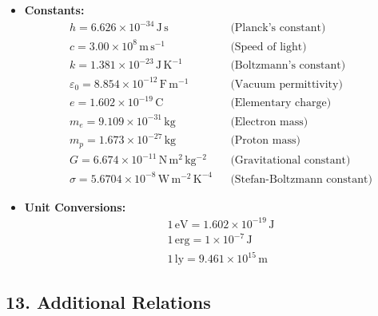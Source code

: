 \documentclass{article}
\begin{document}
\begin{itemize}
    \item \textbf{Constants:}
          \begin{align*}
               & h = 6.626 \times 10^{-34} \, \mathrm{J\,s}                   &  & \text{(Planck's constant)}         \\
               & c = 3.00 \times 10^8 \, \mathrm{m\,s^{-1}}                   &  & \text{(Speed of light)}            \\
               & k = 1.381 \times 10^{-23} \, \mathrm{J\,K^{-1}}              &  & \text{(Boltzmann's constant)}      \\
               & \varepsilon_0 = 8.854 \times 10^{-12} \, \mathrm{F\,m^{-1}}  &  & \text{(Vacuum permittivity)}       \\
               & e = 1.602 \times 10^{-19} \, \mathrm{C}                      &  & \text{(Elementary charge)}         \\
               & m_e = 9.109 \times 10^{-31} \, \mathrm{kg}                   &  & \text{(Electron mass)}             \\
               & m_p = 1.673 \times 10^{-27} \, \mathrm{kg}                   &  & \text{(Proton mass)}               \\
               & G = 6.674 \times 10^{-11} \, \mathrm{N\,m^2\,kg^{-2}}        &  & \text{(Gravitational constant)}    \\
               & \sigma = 5.6704 \times 10^{-8} \, \mathrm{W\,m^{-2}\,K^{-4}} &  & \text{(Stefan-Boltzmann constant)}
          \end{align*}
    \item \textbf{Unit Conversions:}
          \begin{align*}
               & 1 \, \mathrm{eV} = 1.602 \times 10^{-19} \, \mathrm{J} \\
               & 1 \, \mathrm{erg} = 1 \times 10^{-7} \, \mathrm{J}     \\
               & 1 \, \mathrm{ly} = 9.461 \times 10^{15} \, \mathrm{m}
          \end{align*}
\end{itemize}

\subsection*{13. Additional Relations}
\end{document}
